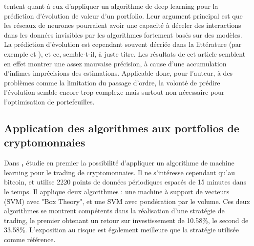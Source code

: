 \documentclass[a4paper, 10pt]{article}
\begin{document}
\textbf{\citet{Heaton2017}} tentent quant à eux d'appliquer un algorithme de deep learning pour la prédiction d'évolution de valeur d'un portfolio. Leur argument principal est que les réseaux de neurones pourraient avoir une capacité à déceler des interactions dans les données invisibles par les algorithmes fortement basés sur des modèles. La prédiction d'évolution est cependant souvent décriée dans la littérature (par exemple \cite{Moody2001} et \cite{Jiang2017}), et ce, semble-t-il, à juste titre. Les résultats de cet article semblent en effet montrer une assez mauvaise précision, à cause d'une accumulation d'infimes imprécisions des estimations. Applicable donc, pour l'auteur, à des problèmes comme la limitation du passage d'ordre, la volonté de prédire l'évolution semble encore trop complexe mais surtout non nécessaire pour l'optimisation de portefeuilles.

\subsection{Application des algorithmes aux portfolios de cryptomonnaies}

Dans \textbf{, \citet{Zbikowski2016}} étudie en premier la possibilité d'appliquer un algorithme de machine learning pour le trading de cryptomonnaies. Il ne s'intéresse cependant qu'au bitcoin, et utilise 2220 points de données périodiques espacés de 15 minutes dans le temps. Il applique deux algorithmes : une machine à support de vecteurs (SVM) avec "Box Theory", et une SVM avec pondération par le volume. Ces deux algorithmes se montrent compétents dans la réalisation d'une stratégie de trading, le premier obtenant un retour sur investissement de 10.58\%, le second de 33.58\%. L'exposition au risque est également meilleure que la stratégie utilisée comme référence.
\end{document}
